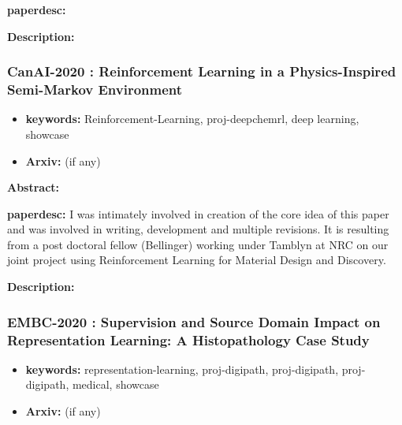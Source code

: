 \documentclass{article}
\begin{document}
\textbf{paperdesc:} 

\textbf{Description:} 



\newpage
\subsubsection{\textbf{CanAI-2020} : Reinforcement Learning in a Physics-Inspired Semi-Markov Environment}
\begin{itemize}
\item \textbf{keywords:} Reinforcement-Learning, proj-deepchemrl, deep learning, showcase
\item \textbf{Arxiv:}  (if any)
\end{itemize}


\textbf{Abstract:} 

\textbf{paperdesc:} I was intimately involved in creation of the core idea of this paper and was involved in writing, development and multiple revisions. It is resulting from a post doctoral fellow (Bellinger) working under Tamblyn at NRC on our joint project using Reinforcement Learning for Material Design and Discovery.

\textbf{Description:} 



\newpage
\subsubsection{\textbf{EMBC-2020} : Supervision and Source Domain Impact on Representation Learning: A Histopathology Case Study}
\begin{itemize}
\item \textbf{keywords:} representation-learning, proj-digipath, proj-digipath, proj-digipath, medical, showcase
\item \textbf{Arxiv:}  (if any)
\end{itemize}
\end{document}
